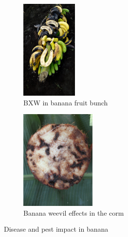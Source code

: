 \begin{figure}[H]
     \centering
     \begin{subfigure}[b]{0.3\textwidth}
         \centering
         \includegraphics[width=0.9\linewidth, height=5cm]{Figures/bunch.pdf} 
         \caption{BXW in banana fruit bunch}
         \label{fig:subim1}
     \end{subfigure}
     \hfill
     \begin{subfigure}[b]{0.3\textwidth}
         \centering
         \includegraphics[width=0.9\linewidth, height=5cm]{Figures/corm.pdf}
         \caption{Banana weevil effects in the corm}
         \label{fig:subim2}
     \end{subfigure}
     \hfill
        \caption{Disease and pest impact in banana}
        \label{fig:image2}
\end{figure}


